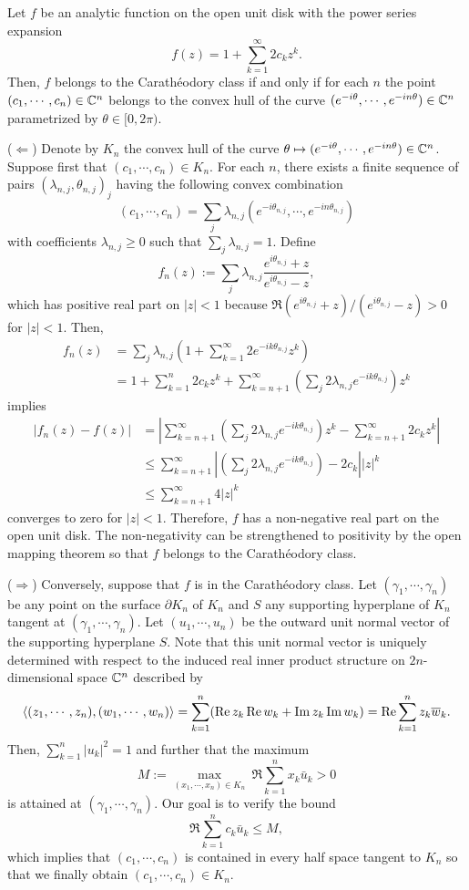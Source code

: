 \documentclass{../../small}
\begin{document}
\begin{thm}
Let $f$ be an analytic function on the open unit disk with the power series expansion
\[f(z)=1+\sum_{k=1}^\infty2c_kz^k.\]
Then, $f$ belongs to the Carath\'eodory class if and only if for each $n$ the point $(c_1,\cdots,c_n)\in\mathbb{C}^n$ belongs to the convex hull of the curve $(e^{-i\theta},\cdots,e^{-in\theta})\in\mathbb{C}^n$ parametrized by $\theta\in[0,2\pi)$.
\end{thm}
\begin{pf}
($\Leftarrow$)
Denote by $K_n$ the convex hull of the curve $\theta\mapsto(e^{-i\theta},\cdots,e^{-in\theta})\in\mathbb{C}^n$.
Suppose first that $(c_1,\cdots,c_n)\in K_n$.
For each $n$, there exists a finite sequence of pairs $(\lambda_{n,j},\theta_{n,j})_j$ having the following convex combination
\[(c_1,\cdots,c_n)=\sum_j\lambda_{n,j}(e^{-i\theta_{n,j}},\cdots,e^{-in\theta_{n,j}})\]
with coefficients $\lambda_{n,j}\ge0$ such that $\sum_j\lambda_{n,j}=1$.
Define
\[f_n(z):=\sum_j\lambda_{n,j}\frac{e^{i\theta_{n,j}}+z}{e^{i\theta_{n,j}}-z},\]
which has positive real part on $|z|<1$ because $\Re(e^{i\theta_{n,j}}+z)/(e^{i\theta_{n,j}}-z)>0$ for $|z|<1$.
Then,
\begin{align*}
f_n(z)
&=\sum_j\lambda_{n,j}(1+\sum_{k=1}^\infty2e^{-ik\theta_{n,j}}z^k)\\
&=1+\sum_{k=1}^n2c_kz^k+\sum_{k=n+1}^\infty\left(\sum_j2\lambda_{n,j}e^{-ik\theta_{n,j}}\right)z^k
\end{align*}
implies
\begin{align*}
|f_n(z)-f(z)|
&=\left|\sum_{k=n+1}^\infty\left(\sum_j2\lambda_{n,j}e^{-ik\theta_{n,j}}\right)z^k-\sum_{k=n+1}^\infty2c_kz^k\right|\\
&\le\sum_{k=n+1}^\infty\left|\left(\sum_j2\lambda_{n,j}e^{-ik\theta_{n,j}}\right)-2c_k\right||z|^k\\
&\le\sum_{k=n+1}^\infty4|z|^k
\end{align*}
converges to zero for $|z|<1$.
Therefore, $f$ has a non-negative real part on the open unit disk.
The non-negativity can be strengthened to positivity by the open mapping theorem so that $f$ belongs to the Carath\'eodory class.

($\Rightarrow$)
Conversely, suppose that $f$ is in the Carath\'eodory class.
Let $(\gamma_1,\cdots,\gamma_n)$ be any point on the surface $\partial K_n$ of $K_n$ and $S$ any supporting hyperplane of $K_n$ tangent at $(\gamma_1,\cdots,\gamma_n)$.
Let $(u_1,\cdots,u_n)$ be the outward unit normal vector of the supporting hyperplane $S$.
Note that this unit normal vector is uniquely determined with respect to the induced real inner product structure on $2n$-dimensional space $\mathbb{C}^n$ described by
\[\langle(z_1,\cdots,z_n),(w_1,\cdots,w_n)\rangle=\sum_{k=1}^n(\operatorname{Re} z_k\operatorname{Re} w_k+\operatorname{Im} z_k\operatorname{Im} w_k)=\operatorname{Re}\sum_{k=1}^nz_k\overline w_k.\]
Then, $\sum_{k=1}^n|u_k|^2=1$ and further that the maximum
\[M:=\max_{(x_1,\cdots,x_n)\in K_n}\ \Re\sum_{k=1}^nx_k\bar u_k>0\]
is attained at $(\gamma_1,\cdots,\gamma_n)$.
Our goal is to verify the bound
\[\Re\sum_{k=1}^nc_k\bar u_k\le M,\]
which implies that $(c_1,\cdots,c_n)$ is contained in every half space tangent to $K_n$ so that we finally obtain $(c_1,\cdots,c_n)\in K_n$.


\end{pf}
\end{document}
